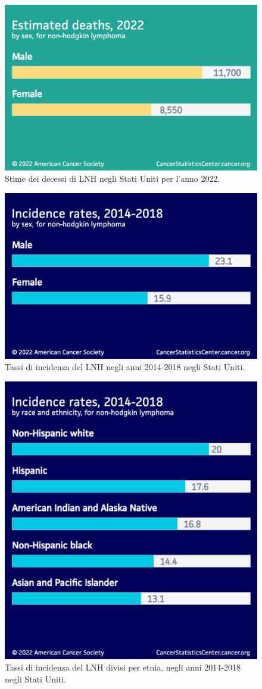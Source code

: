 \begin{figure}[H]
    \begin{center}
    \includegraphics[width=0.5\columnwidth]{img/Estimateddeaths2022.png}
    \vspace{-3mm}
    \end{center}
    \caption{Stime dei decessi di LNH negli Stati Uniti per l’anno 2022.
    \cite{Americanstatistic}}
    \label{fig:FIGURE_2.8}
\end{figure}

\begin{figure}[H]
    \begin{center}
    \includegraphics[width=0.5\columnwidth]{img/Incidencerates2014-18.png}
    \vspace{-3mm}
    \end{center}
    \caption{Tassi di incidenza del LNH negli anni 2014-2018 negli Stati Uniti.
    \cite{Americanstatistic}}

\end{figure}

\begin{figure}[H]
    \begin{center}
    \includegraphics[width=0.4\columnwidth]{img/Incidencerates2014-18race-ethnicity.png}
    \vspace{-3mm}
    \end{center}
    \caption{Tassi di incidenza del LNH divisi per etnia, negli anni 2014-2018 negli Stati Uniti.
    \cite{Americanstatistic}}

\end{figure}

